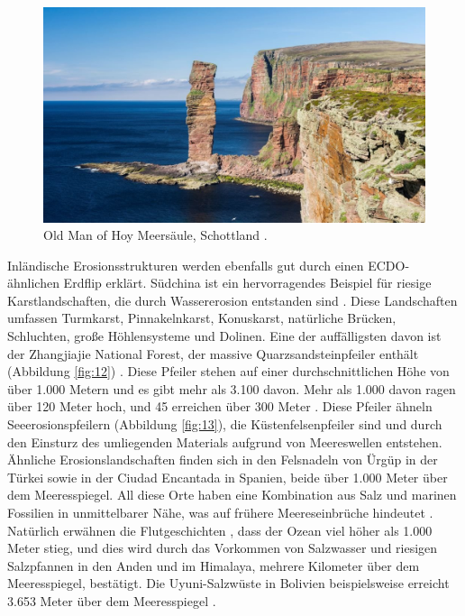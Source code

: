 \documentclass[10pt,twocolumn,letterpaper]{article}
\begin{document}
\begin{figure}[b]
\begin{center}
   \includegraphics[width=1\linewidth]{hoy.jpg}
\end{center}
   \caption{Old Man of Hoy Meersäule, Schottland \cite{83}.}
\label{fig:13}
\label{fig:onecol}
\end{figure}
Inländische Erosionsstrukturen werden ebenfalls gut durch einen ECDO-ähnlichen Erdflip erklärt. Südchina ist ein hervorragendes Beispiel für riesige Karstlandschaften, die durch Wassererosion entstanden sind \cite{82}. Diese Landschaften umfassen Turmkarst, Pinnakelnkarst, Konuskarst, natürliche Brücken, Schluchten, große Höhlensysteme und Dolinen. Eine der auffälligsten davon ist der Zhangjiajie National Forest, der massive Quarzsandsteinpfeiler enthält (Abbildung \ref{fig:12}) \cite{84}. Diese Pfeiler stehen auf einer durchschnittlichen Höhe von über 1.000 Metern und es gibt mehr als 3.100 davon. Mehr als 1.000 davon ragen über 120 Meter hoch, und 45 erreichen über 300 Meter \cite{85}. Diese Pfeiler ähneln Seeerosionspfeilern (Abbildung \ref{fig:13}), die Küstenfelsenpfeiler sind und durch den Einsturz des umliegenden Materials aufgrund von Meereswellen entstehen. Ähnliche Erosionslandschaften finden sich in den Felsnadeln von Ürgüp in der Türkei sowie in der Ciudad Encantada in Spanien, beide über 1.000 Meter über dem Meeresspiegel. All diese Orte haben eine Kombination aus Salz und marinen Fossilien in unmittelbarer Nähe, was auf frühere Meereseinbrüche hindeutet \cite{15,86,87}. Natürlich erwähnen die Flutgeschichten \cite{3}, dass der Ozean viel höher als 1.000 Meter stieg, und dies wird durch das Vorkommen von Salzwasser und riesigen Salzpfannen in den Anden und im Himalaya, mehrere Kilometer über dem Meeresspiegel, bestätigt. Die Uyuni-Salzwüste in Bolivien beispielsweise erreicht 3.653 Meter über dem Meeresspiegel \cite{94}.
\end{document}

